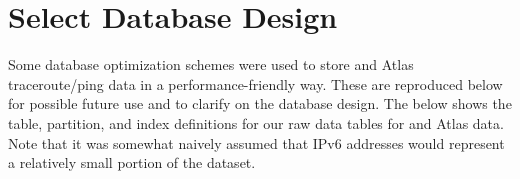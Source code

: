 \chapter{Select Database Design}\label{sec:db_queries}

Some database optimization schemes were used to store \caida and \ripe Atlas traceroute/ping data in a performance-friendly way. These are reproduced below for possible future use and to clarify on the database design. The below shows the table, partition, and index definitions for our raw data tables for \caida and \ripe Atlas data. Note that it was somewhat naively assumed that IPv6 addresses would represent a relatively small portion of the dataset.

